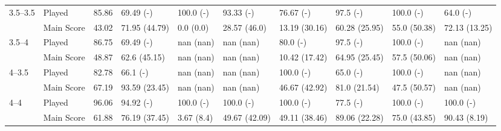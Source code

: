 \begin{tabular}{llrlllllll}
\cline{1-10}
\multirow[t]{2}{*}{3.5--3.5} & Played & 85.86 & 69.49 (-) & 100.0 (-) & 93.33 (-) & 76.67 (-) & 97.5 (-) & 100.0 (-) & 64.0 (-) \\
 & Main Score & 43.02 & 71.95 (44.79) & 0.0 (0.0) & 28.57 (46.0) & 13.19 (30.16) & 60.28 (25.95) & 55.0 (50.38) & 72.13 (13.25) \\
\cline{1-10}
\multirow[t]{2}{*}{3.5--4} & Played & 86.75 & 69.49 (-) & nan (nan) & nan (nan) & 80.0 (-) & 97.5 (-) & 100.0 (-) & nan (nan) \\
 & Main Score & 48.87 & 62.6 (45.15) & nan (nan) & nan (nan) & 10.42 (17.42) & 64.95 (25.45) & 57.5 (50.06) & nan (nan) \\
\cline{1-10}
\multirow[t]{2}{*}{4--3.5} & Played & 82.78 & 66.1 (-) & nan (nan) & nan (nan) & 100.0 (-) & 65.0 (-) & 100.0 (-) & nan (nan) \\
 & Main Score & 67.19 & 93.59 (23.45) & nan (nan) & nan (nan) & 46.67 (42.92) & 81.0 (21.54) & 47.5 (50.57) & nan (nan) \\
\cline{1-10}
\multirow[t]{2}{*}{4--4} & Played & 96.06 & 94.92 (-) & 100.0 (-) & 100.0 (-) & 100.0 (-) & 77.5 (-) & 100.0 (-) & 100.0 (-) \\
 & Main Score & 61.88 & 76.19 (37.45) & 3.67 (8.4) & 49.67 (42.09) & 49.11 (38.46) & 89.06 (22.28) & 75.0 (43.85) & 90.43 (8.19) \\
\cline{1-10}
\bottomrule
\end{tabular}
